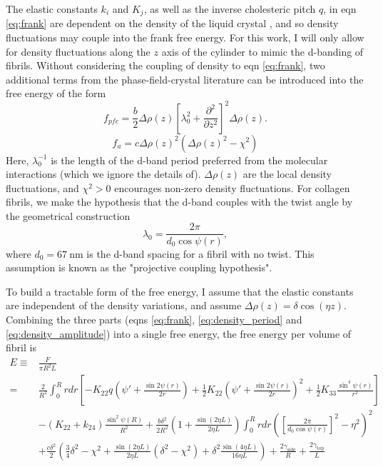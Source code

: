 \documentclass[12pt]{article}
\begin{document}
The elastic constants $k_i$ and $K_j$, as well as the inverse cholesteric pitch $q$, in eqn \ref{eq:frank} are dependent on the density of the liquid crystal \cite{Odijk:liqcryst1986}, and so density fluctuations may couple into the frank free energy. For this work, I will only allow for density fluctuations along the $z$ axis of the cylinder to mimic the d-banding of fibrils. Without considering the coupling of density to eqn \ref{eq:frank}, two additional terms from the phase-field-crystal literature can be introduced into the free energy of the form
\begin{equation}\label{eq:density_period}
f_{pfc}=\frac{b}{2}\Delta\rho(z)\left[\lambda_0^2+\frac{\partial^2}{\partial z^2}\right]^2\Delta\rho(z).
\end{equation}
\begin{equation}
\label{eq:density_amplitude}
f_{a}=c\Delta\rho(z)^2\left(\Delta\rho(z)^2-\chi^2\right)
\end{equation}
Here, $\lambda_0^{-1}$ is the length of the d-band period preferred from the molecular interactions (which we ignore the details of). $\Delta\rho(z)$ are the local density fluctuations, and $\chi^2>0$ encourages non-zero density fluctuations. For collagen fibrils, we make the hypothesis that the d-band couples with the twist angle by the geometrical construction
\begin{equation}\label{eq:lmbda}
\lambda_0=\frac{2\pi}{d_0\cos\psi(r)},
\end{equation}
where $d_0=\SI{67}{\nano\meter}$ is the d-band spacing for a fibril with no twist. This assumption is known as the "projective coupling hypothesis".

To build a tractable form of the free energy, I assume that the elastic constants are independent of the density variations, and assume $\Delta\rho(z)=\delta\cos(\eta z)$. Combining the three parts (eqns \ref{eq:frank}, \ref{eq:density_period} and \ref{eq:density_amplitude}) into a single free energy, the free energy per volume of fibril is
\begin{align}\label{eq:FE}
E\equiv& \frac{F}{\pi R^2 L}\nonumber\\
=&\frac{2}{R^2}\int_0^Rrdr\left[-K_{22}q\left(\psi'+\frac{\sin2\psi(r)}{2r}\right)+\frac{1}{2}K_{22}\left(\psi'+\frac{\sin2\psi(r)}{2r}\right)^2+\frac{1}{2}K_{33}\frac{\sin^4\psi(r)}{r^2}\right]\nonumber\\
&-(K_{22}+k_{24})\frac{\sin^2\psi(R)}{R^2}+\frac{b\delta^2}{2R^2}\left(1+\frac{\sin(2\eta L)}{2\eta L}\right) \int_0^Rrdr\left(\left[\frac{2\pi}{d_0\cos\psi(r)}\right]^2-\eta^2\right)^2\nonumber\\
&+\frac{c\delta^2}{2}\left(\frac{3}{4}\delta^2-\chi^2+\frac{\sin(2\eta L)}{2\eta L}\left(\delta^2-\chi^2\right)+\delta^2\frac{\sin(4\eta L)}{16\eta L}\right)+\frac{2\gamma_{\text{side}}}{R}+\frac{2\gamma_{\text{top}}}{L}
\end{align}
\end{document}
